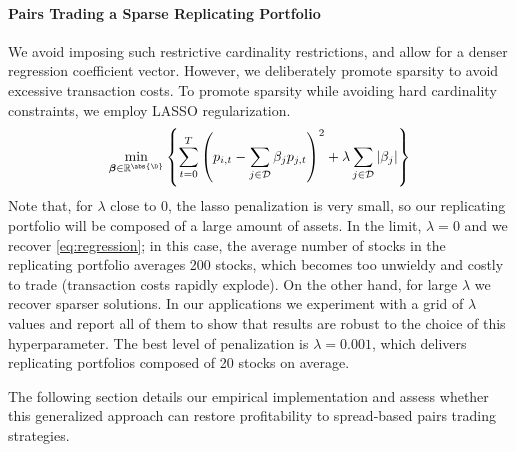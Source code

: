 \paragraph{Pairs Trading a Sparse Replicating Portfolio} We avoid imposing such restrictive cardinality restrictions, and allow for a denser regression coefficient vector. However, we deliberately promote sparsity to avoid excessive transaction costs. To promote sparsity while avoiding hard cardinality constraints, we employ LASSO regularization. 
\begin{align}
\label{eq:lasso}
\min_{\boldsymbol \beta \in \mathbb R^{\abs{\D}}} 
\left\{ 
\sum_{t=0}^T 
\left( 
p_{i,t} - \sum_{j \in \mathcal{D}} \beta_j p_{j,t} 
\right)^2 
+ 
\lambda \sum_{j \in \mathcal{D}} |\beta_j| 
\right\}
\end{align}
Note that, for $\lambda$ close to 0, the lasso penalization is very small, so our replicating portfolio will be composed of a large amount of assets. In the limit, $\lambda=0$ and we recover \cref{eq:regression}; in this case, the average number of stocks in the replicating portfolio averages 200 stocks, which becomes too unwieldy and costly to trade (transaction costs rapidly explode). On the other hand, for large $\lambda$ we recover sparser solutions. In our applications we experiment with a grid of $\lambda$ values and report all of them to show that results are robust to the choice of this hyperparameter. The best level of penalization is $\lambda=0.001$, which delivers replicating portfolios composed of 20 stocks on average. 
 

 The following section details our empirical implementation and assess whether this generalized approach can restore profitability to spread-based pairs trading strategies.

